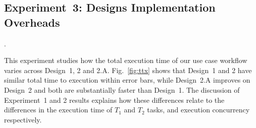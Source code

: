 \subsection{Experiment~3: Designs Implementation Overheads}\label{ssec:exp3}. 

This experiment studies how the total execution time of our use case workflow varies across Design~1, 2 and 2.A. Fig.~\ref{fig:ttx} shows that Design~1 and 2 have similar total time to execution within error bars, while Design~2.A improves on Design~2 and both are substantially faster than Design~1.
The discussion of Experiment~1 and 2 results explains how these differences relate to the differences in the execution time of $T_{1}$ and $T_{2}$ tasks, and execution concurrency respectively.

